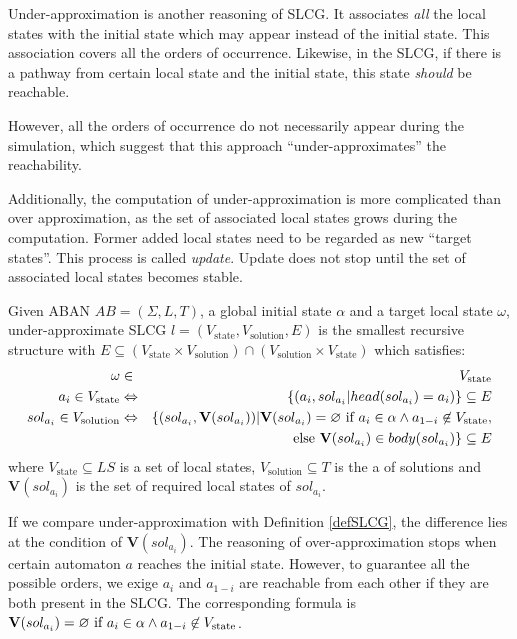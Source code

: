 Under-approximation is another reasoning of SLCG. 
It associates \textit{all} the local states with the initial state which may appear instead of the initial state.
This association covers all the orders of occurrence.
Likewise, in the SLCG, if there is a pathway from certain local state and the initial state, this state \textit{should} be reachable.

However, all the orders of occurrence do not necessarily appear during the simulation, which suggest that this approach ``under-approximates'' the reachability.

Additionally, the computation of under-approximation is more complicated than over approximation, as the set of associated local states grows during the computation.
Former added local states need to be regarded as new ``target states''.
This process is called \textit{update}. 
Update does not stop until the set of associated local states becomes stable.


\begin{definition}
Given ABAN $AB = (\Sigma,L,T)$, a global initial state $\alpha$ and a target local state $\omega$, under-approximate SLCG $l= (V_{\mathrm{state}},V_{\mathrm{solution}},E)$ is the smallest recursive structure with $E \subseteq (V_{\mathrm{state}}\times V_{\mathrm{solution}})\cap (V_{\mathrm{solution}}\times V_{\mathrm{state}})$ which satisfies:
\begin{eqnarray*}
    \omega&\in& V_{\mathrm{state}} \\
    a_i\in V_{\mathrm{state}} &\Leftrightarrow& \{ (a_i, sol_{a_i}| head(sol_{a_i})=a_i)\}\subseteq E \\
    sol_{a_i}\in V_{\mathrm{solution}}&\Leftrightarrow& \{ (sol_{a_i},\mathbf{V}(sol_{a_i}))| \mathbf{V}(sol_{a_i})=\varnothing \text{ \rm if } a_i\in \alpha\land a_{1-i}\not\in V_{\mathrm{state}},\\
    &&\text{ \rm else }\mathbf{V}(sol_{a_i})\in body(sol_{a_i}) \}\subseteq E
\end{eqnarray*}
where $V_{\mathrm{state}}\subseteq LS$ is a set of local states, $V_{\mathrm{solution}}\subseteq T$ is the a of solutions and $\mathbf{V}(sol_{a_i})$ is the set of required local states of $sol_{a_i}$. 
\end{definition}

If we compare under-approximation with Definition \ref{defSLCG}, the difference lies at the condition of $\mathbf{V}(sol_{a_i})$. 
The reasoning of over-approximation stops when certain automaton $a$ reaches the initial state. 
However, to guarantee all the possible orders, we exige $a_i$ and $a_{1-i}$ are reachable from each other if they are both present in the SLCG.
The corresponding formula is $\mathbf{V}(sol_{a_i})=\varnothing \text{ \rm if } a_i\in \alpha\land a_{1-i}\not\in V_{\mathrm{state}}$.

